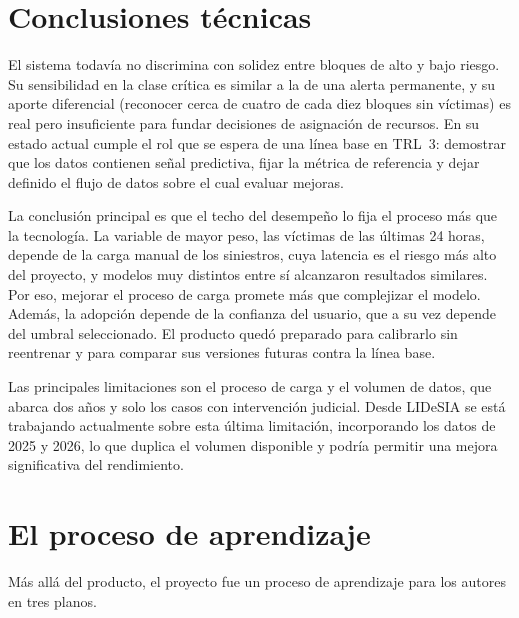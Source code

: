 \section{Conclusiones técnicas}\label{sec:conclusiones-tecnicas}

El sistema todavía no discrimina con solidez entre bloques de alto y bajo riesgo. Su sensibilidad en la clase crítica es similar a la de una alerta permanente, y su aporte diferencial (reconocer cerca de cuatro de cada diez bloques sin víctimas) es real pero insuficiente para fundar decisiones de asignación de recursos. En su estado actual cumple el rol que se espera de una línea base en TRL~3: demostrar que los datos contienen señal predictiva, fijar la métrica de referencia y dejar definido el flujo de datos sobre el cual evaluar mejoras.

La conclusión principal es que el techo del desempeño lo fija el proceso más que la tecnología. La variable de mayor peso, las víctimas de las últimas 24 horas, depende de la carga manual de los siniestros, cuya latencia es el riesgo más alto del proyecto, y modelos muy distintos entre sí alcanzaron resultados similares. Por eso, mejorar el proceso de carga promete más que complejizar el modelo. Además, la adopción depende de la confianza del usuario, que a su vez depende del umbral seleccionado. El producto quedó preparado para calibrarlo sin reentrenar y para comparar sus versiones futuras contra la línea base.

Las principales limitaciones son el proceso de carga y el volumen de datos, que abarca dos años y solo los casos con intervención judicial. Desde LIDeSIA se está trabajando actualmente sobre esta última limitación, incorporando los datos de 2025 y 2026, lo que duplica el volumen disponible y podría permitir una mejora significativa del rendimiento.

\section{El proceso de aprendizaje}\label{sec:proceso-aprendizaje}

Más allá del producto, el proyecto fue un proceso de aprendizaje para los autores en tres planos.

